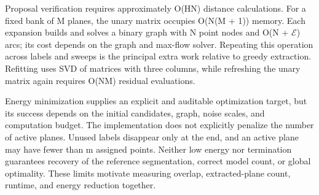 Proposal verification requires approximately O(HN) distance calculations. For a fixed bank of M planes, the unary matrix occupies O(N(M + 1)) memory. Each expansion builds and solves a binary graph with N point nodes and O(N + \textbar \(\mathcal E\)\textbar) arcs; its cost depends on the graph and max-flow solver. Repeating this operation across labels and sweeps is the principal extra work relative to greedy extraction. Refitting uses SVD of matrices with three columns, while refreshing the unary matrix again requires O(NM) residual evaluations.

Energy minimization supplies an explicit and auditable optimization target, but its success depends on the initial candidates, graph, noise scales, and computation budget. The implementation does not explicitly penalize the number of active planes. Unused labels disappear only at the end, and an active plane may have fewer than m assigned points. Neither low energy nor termination guarantees recovery of the reference segmentation, correct model count, or global optimality. These limits motivate measuring overlap, extracted-plane count, runtime, and energy reduction together.
